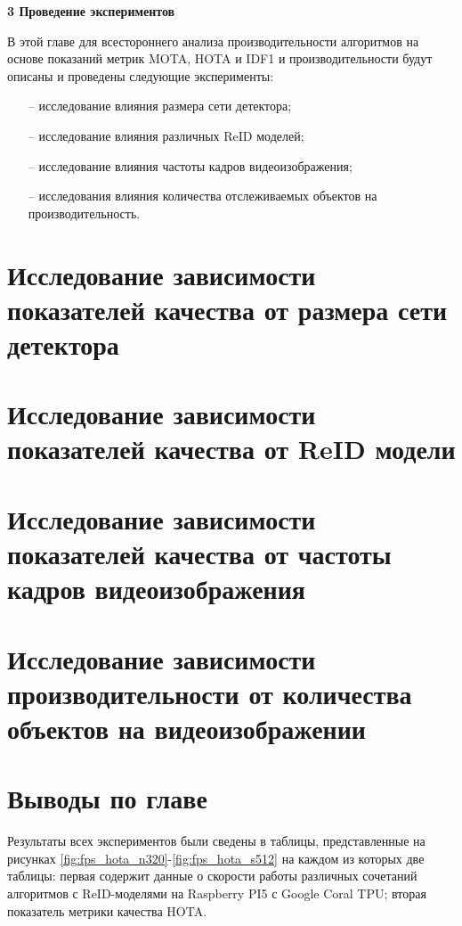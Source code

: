 \newpage
\begin{flushleft}
  \textbf{\large 3 Проведение экспериментов}
\end{flushleft}
В этой главе для всестороннего анализа производительности алгоритмов на основе показаний метрик MOTA, HOTA и IDF1 и производительности будут описаны и проведены следующие эксперименты:
\begin{itemize}
  \item[--] исследование влияния размера сети детектора;
  \item[--] исследование влияния различных ReID моделей;
  \item[--] исследование влияния частоты кадров видеоизображения;
  \item[--] исследования влияния количества отслеживаемых объектов на производительность.
\end{itemize}


\section{Исследование зависимости показателей качества от размера сети детектора}



\section{Исследование зависимости показателей качества от ReID модели}


\section{Исследование зависимости показателей качества от частоты кадров видеоизображения}


\section{Исследование зависимости производительности от количества объектов на видеоизображении}


\section{Выводы по главе}
Результаты всех экспериментов были сведены в таблицы, представленные на рисунках \ref{fig:fps_hota_n320}-\ref{fig:fps_hota_s512} на каждом из которых две таблицы: первая содержит данные о скорости работы различных сочетаний алгоритмов с ReID-моделями на Raspberry PI5 с Google Coral TPU; вторая показатель метрики качества HOTA. 

